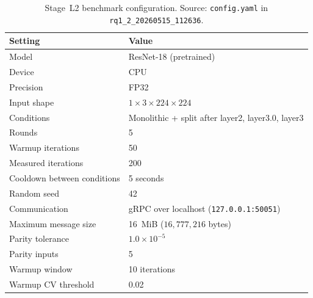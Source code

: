 \begin{table}[t]
\centering
\caption[Stage~L2 benchmark configuration]{Stage~L2 benchmark configuration. Source: \texttt{config.yaml} in \texttt{rq1\_2\_20260515\_112636}.}
\label{tab:rq12-config}
\begin{tabular}{ll}
\toprule
\textbf{Setting} & \textbf{Value} \\
\midrule
Model                          & ResNet-18 (pretrained) \\
Device                         & CPU \\
Precision                      & FP32 \\
Input shape                    & $1 \times 3 \times 224 \times 224$ \\
Conditions                     & Monolithic + split after layer2, layer3.0, layer3 \\
Rounds                         & 5 \\
Warmup iterations              & 50 \\
Measured iterations            & 200 \\
Cooldown between conditions    & 5 seconds \\
Random seed                    & 42 \\
Communication                  & gRPC over localhost (\texttt{127.0.0.1:50051}) \\
Maximum message size           & 16~MiB ($16{,}777{,}216$ bytes) \\
Parity tolerance               & $1.0 \times 10^{-5}$ \\
Parity inputs                  & 5 \\
Warmup window                  & 10 iterations \\
Warmup CV threshold            & 0.02 \\
\bottomrule
\end{tabular}
\end{table}

